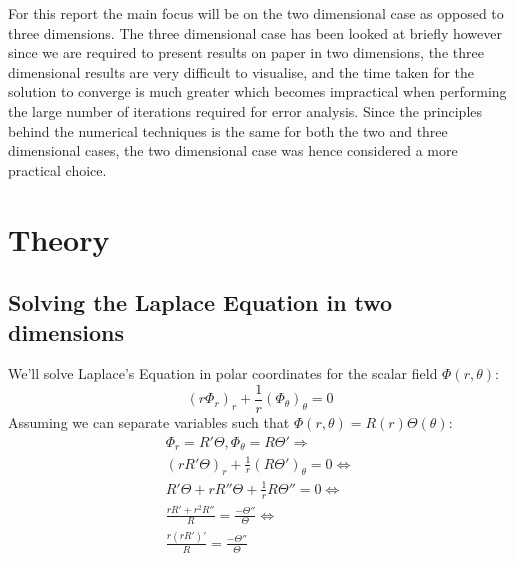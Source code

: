 \documentclass[aps,twocolumn,pre,nofootinbib,10pt]{revtex4-1}
\begin{document}
For this report the main focus will be on the two dimensional case as opposed to three dimensions. The three dimensional case has been looked at briefly however since we are required to present results on paper in two dimensions, the three dimensional results are very difficult to visualise, and the time taken for the solution to converge is much greater which becomes impractical when performing the large number of iterations required for error analysis. Since the principles behind the numerical techniques is the same for both the two and three dimensional cases, the two dimensional case was hence considered a more practical choice.


\section{Theory \label{sec:the}}

\subsection{Solving the Laplace Equation in two dimensions}
We'll solve Laplace's Equation in polar coordinates for the scalar field $\Phi(r, \theta)$:
\[ \left( r \Phi_r \right)_r + \frac{1}{r} \left(\Phi_\theta \right)_\theta = 0 \]
Assuming we can separate variables such that $\Phi(r, \theta) = R(r)\Theta(\theta)$:
\begin{gather*}
 \Phi_r = R'\Theta, \Phi_\theta = R\Theta' \Rightarrow \\
 (rR'\Theta)_r + \frac{1}{r}(R\Theta')_\theta = 0 \Leftrightarrow \\
 R'\Theta + rR''\Theta + \frac{1}{r}R\Theta'' = 0 \Leftrightarrow \\
 \frac{rR' + r^2 R''}{R} = \frac{- \Theta''}{\Theta} \Leftrightarrow \\
 \frac{r(rR')'}{R} = \frac{- \Theta''}{\Theta}
\end{gather*}
\end{document}
